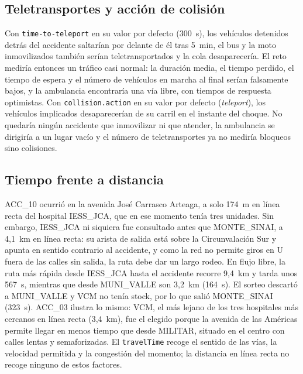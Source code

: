 \documentclass[conference,a4paper]{IEEEtran}
\begin{document}
\subsection{Teletransportes y acción de colisión}
Con \texttt{time-to-teleport} en su valor por defecto (300~s), los vehículos detenidos
detrás del accidente saltarían por delante de él tras 5~min, el bus y la moto
inmovilizados también serían teletransportados y la cola desaparecería. El reto mediría
entonces un tráfico casi normal: la duración media, el tiempo perdido, el tiempo de
espera y el número de vehículos en marcha al final serían falsamente bajos, y la
ambulancia encontraría una vía libre, con tiempos de respuesta optimistas. Con
\texttt{collision.action} en su valor por defecto (\emph{teleport}), los vehículos
implicados desaparecerían de su carril en el instante del choque. No quedaría ningún
accidente que inmovilizar ni que atender, la ambulancia se dirigiría a un lugar vacío y el
número de teletransportes ya no mediría bloqueos sino colisiones.

\subsection{Tiempo frente a distancia}
ACC\_10 ocurrió en la avenida José Carrasco Arteaga, a solo 174~m en línea recta del
hospital IESS\_JCA, que en ese momento tenía tres unidades. Sin embargo, IESS\_JCA ni
siquiera fue consultado antes que MONTE\_SINAI, a 4,1~km en línea recta: su arista de
salida está sobre la Circunvalación Sur y apunta en sentido contrario al accidente, y como
la red no permite giros en U fuera de las calles sin salida, la ruta debe dar un largo
rodeo. En flujo libre, la ruta más rápida desde IESS\_JCA hasta el
accidente recorre 9,4~km y tarda unos 567~s, mientras que desde MUNI\_VALLE son 3,2~km
(164~s). El sorteo descartó a MUNI\_VALLE y VCM no tenía stock, por lo que salió
MONTE\_SINAI (323~s). ACC\_03 ilustra lo mismo: VCM, el más lejano de los tres
hospitales más cercanos en línea recta (3,4~km), fue el elegido porque la avenida de las
Américas permite llegar en menos tiempo que desde MILITAR, situado en el centro con calles
lentas y semaforizadas. El \texttt{travelTime} recoge el sentido de las vías, la
velocidad permitida y la congestión del momento; la distancia en línea recta no recoge
ninguno de estos factores.
\end{document}
